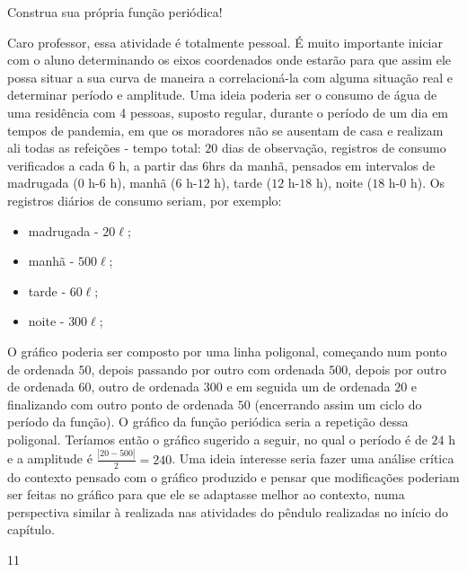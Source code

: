 \begin{sugestions}{Construa sua própria função periódica!}
{
	Caro professor, essa atividade é totalmente pessoal. É muito importante iniciar com o aluno determinando os eixos coordenados onde estarão para que assim ele possa situar a sua curva de maneira a correlacioná-la com alguma situação real e determinar período e amplitude. Uma ideia poderia ser o consumo de água de uma residência com 4 pessoas, suposto regular, durante o período de um dia em tempos de pandemia, em que os moradores não se ausentam de casa e realizam ali todas as refeições - tempo total: $20$ dias de observação, registros de consumo verificados a cada $6$ h, a partir das 6hrs da manhã, pensados em intervalos de madrugada ($0$ h-$6$ h), manhã ($6$ h-$12$ h), tarde ($12$ h-$18$ h), noite ($18$ h-$0$ h). Os registros diários de consumo seriam, por exemplo:
	\begin{itemize}[topsep=2pt]
	 \item madrugada - $20\ell$; 
	 \item manhã - $500\ell$; 
	 \item tarde - $60\ell$; 
	 \item noite - $300\ell$;
	 \end{itemize}
	 O gráfico poderia ser composto por uma linha poligonal, começando num ponto de ordenada $50$, depois passando por outro com ordenada $500$, depois por outro de ordenada $60$, outro de ordenada $300$ e em seguida um de ordenada $20$ e finalizando com outro ponto de ordenada $50$ (encerrando assim um ciclo do período da função). O gráfico da função periódica seria a repetição dessa poligonal. Teríamos então o gráfico sugerido a seguir, no qual o período é de $24$ h e a amplitude é $\frac{|20 - 500|}{2}=240$. Uma ideia interesse seria fazer uma análise crítica do contexto pensado com o gráfico produzido e pensar que modificações poderiam ser feitas no gráfico para que ele se adaptasse melhor ao contexto, numa perspectiva similar à realizada nas atividades do pêndulo realizadas no início do capítulo.
}{1}{1}
\end{sugestions}
\clearmargin
\clearmargin
\clearmargin
\marginpar{\vspace{.5em}}
